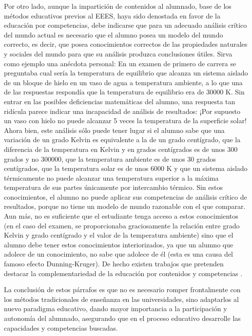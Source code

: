 \documentclass[a4paper,12pt,twoside]{article}
\begin{document}
Por otro lado, aunque la impartición de contenidos al alumnado, base de los métodos educativos previos al EEES, haya sido denostada en favor de la educación por competencias, debe indicarse que para un adecuado análisis crítico del mundo actual es necesario que el alumno posea un modelo del mundo correcto, es decir, que posea conocimientos correctos de las propiedades naturales y sociales del mundo para que su análisis produzca conclusiones útiles. Sirva como ejemplo una anécdota personal: En un examen de primero de carrera se preguntaba cual sería la temperatura de equilibrio que alcanza un sistema aislado de un bloque de hielo en un vaso de agua a temperatura ambiente, a lo que una de las respuestas respondía que la temperatura de equilibrio era de 30000 K. Sin entrar en las posibles deficiencias matemáticas del alumno, una respuesta tan ridícula parece indicar una incapacidad de análisis de resultados: ¡Por supuesto un vaso con hielo no puede alcanzar 5 veces la temperatura de la superficie solar! Ahora bien, este análisis sólo puede tener lugar si el alumno sabe que una variación de un grado Kelvin es equivalente a la de un grado centígrado, que la diferencia de la temperatura en Kelvin y en grados centígrados es de unos 300 grados y no 300000, que la temperatura ambiente es de unos 30 grados centígrados, que la temperatura solar es de unos 6000 K y que un sistema aislado térmicamente no puede alcanzar una temperatura superior a la máxima temperatura de sus partes únicamente por intercambio térmico. Sin estos conocimientos, el alumno no puede aplicar sus competencias de análisis crítico de resultados, porque no tiene un modelo de mundo razonable con el que comparar. Aun más, no es suficiente que el estudiante tenga acceso a estos conocimientos (en el caso del examen, se proporcionaba graciosamente la relación entre grado Kelvin y grado centígrado y el valor de la temperatura ambiente) sino que el alumno debe tener estos conocimientos interiorizados, ya que un alumno que adolece de un conocimiento, no sabe que adolece de él (esta es una causa del famoso efecto Dunning-Kruger). De hecho existen trabajos que pretenden destacar la complementariedad de la educación por contenidos y competencias \cite{Angulo11}.

La conclusión de estos párrafos es que no es necesario romper frontalmente con los métodos tradicionales de enseñanza en las universidades, sino adaptarlos al nuevo paradigma educativo, dando mayor importancia a la participación y autonomía del alumnado, asegurando que en el proceso educativo desarrolle las capacidades y competencias buscadas.
\end{document}
